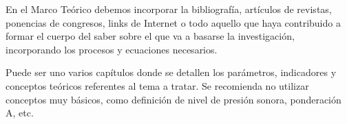 En el Marco Teórico debemos incorporar la bibliografía, artículos de revistas, ponencias de congresos, links de Internet o todo aquello que haya contribuido a formar el cuerpo del saber sobre el que va a basarse la investigación, incorporando los procesos y ecuaciones necesarios.

Puede ser uno varios capítulos donde se detallen los parámetros, indicadores y conceptos teóricos referentes al tema a tratar. Se recomienda no utilizar conceptos muy básicos, como definición de nivel de presión sonora, ponderación A, etc.

